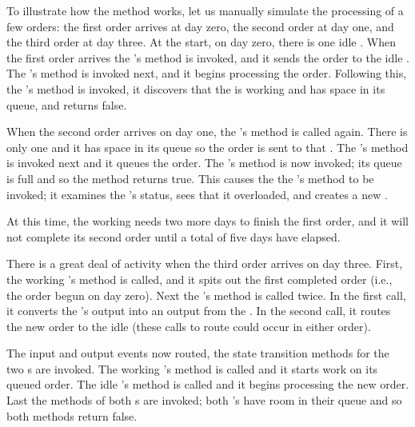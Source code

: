 To illustrate how the  method works, let us manually simulate the processing of a few orders: the first order arrives at day zero, the second order at day one, and the third order at day three. At the start, on day zero, there is one idle . When the first order arrives the 's  method is invoked, and it sends the order to the idle . The 's  method is invoked next, and it begins processing the order. Following this, the 's  method is invoked, it discovers that the  is working and has space in its queue, and returns false.

When the second order arrives on day one, the 's  method is called again. There is only one  and it has space in its queue so the order is sent to that . The 's  method is invoked next and it queues the order. The 's  method is now invoked; its queue is full and so the method returns true. This causes the the 's  method to be invoked; it examines the 's status, sees that it overloaded, and creates a new .

At this time, the working  needs two more days to finish the first order, and it will not complete its second order until a total of five days have elapsed.

There is a great deal of activity when the third order arrives on day three. First, the working 's  method is called, and it spits out the first completed order (i.e., the order begun on day zero). Next the 's  method is called twice. In the first call, it converts the 's output into an output from the . In the second call, it routes the new order to the idle  (these calls to route could occur in either order).

The input and output events now routed, the state transition methods for the two s are invoked. The working 's  method is called and it starts work on its queued order. The idle 's  method is called and it begins processing the new order. Last the  methods of both s are invoked; both 's have room in their queue and so both methods return false.

